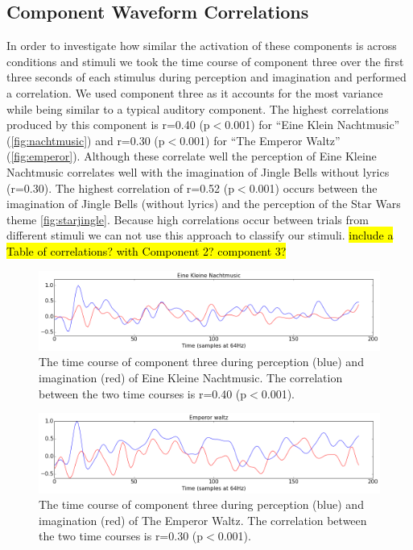 \subsection*{Component Waveform Correlations}
In order to investigate how similar the activation of these components is across conditions and stimuli we took the time course of component three over the first three seconds of each stimulus during perception and imagination and performed a correlation.
We used component three as it accounts for the most variance while being similar to a typical auditory component.
The highest correlations produced by this component is r=0.40 (p$<$0.001) for ``Eine Klein Nachtmusic'' (\autoref{fig:nachtmusic}) and r=0.30 (p$<$0.001) for ``The Emperor Waltz'' (\autoref{fig:emperor}).
Although these correlate well the perception of Eine Kleine Nachtmusic correlates well with the imagination of Jingle Bells without lyrics (r=0.30). 
The highest correlation of r=0.52 (p$<$0.001) occurs between the imagination of Jingle Bells (without lyrics) and the perception of the Star Wars theme \autoref{fig:starjingle}. 
Because high correlations occur between trials from different stimuli we can not use this approach to classify our stimuli.
\hl{include a Table of correlations? with Component 2? component 3?}

\begin{figure}[t]
  \begin{center}
    \includegraphics[scale=0.4]{Figures/EineKleineCorrelation}
    \caption{
The time course of component three during perception (blue) and imagination (red) of Eine Kleine Nachtmusic. The correlation between the two time courses is r=0.40 (p$<$0.001).
}
    \label{fig:nachtmusic}
  \end{center}
\end{figure}

\begin{figure}[t]
  \begin{center}
    \includegraphics[scale=0.4]{Figures/EmperorCorrelation}
    \caption{
The time course of component three during perception (blue) and imagination (red) of The Emperor Waltz. The correlation between the two time courses is r=0.30 (p$<$0.001).
}
    \label{fig:emperor}
  \end{center}
\end{figure}

